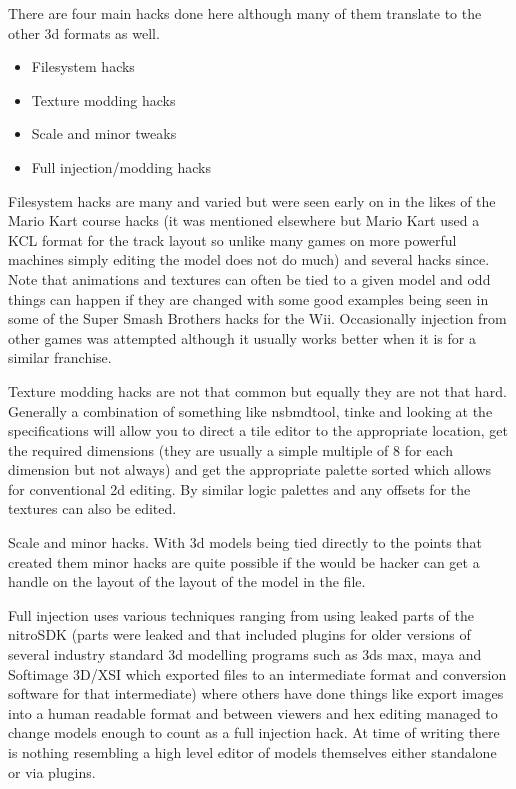 \documentclass[
]{book}
\providecommand{\tightlist}{%
  \setlength{\itemsep}{0pt}\setlength{\parskip}{0pt}}
\begin{document}
There are four main hacks done here although many of them translate to the other 3d formats as well.

\begin{itemize}
\tightlist
\item
  Filesystem hacks
\item
  Texture modding hacks
\item
  Scale and minor tweaks
\item
  Full injection/modding hacks
\end{itemize}

Filesystem hacks are many and varied but were seen early on in the likes of the Mario Kart course hacks (it was mentioned elsewhere but Mario Kart used a KCL format for the track layout so unlike many games on more powerful machines simply editing the model does not do much) and several hacks since. Note that animations and textures can often be tied to a given model and odd things can happen if they are changed with some good examples being seen in some of the Super Smash Brothers hacks for the Wii. Occasionally injection from other games was attempted although it usually works better when it is for a similar franchise.

Texture modding hacks are not that common but equally they are not that hard. Generally a combination of something like nsbmdtool, tinke and looking at the specifications will allow you to direct a tile editor to the appropriate location, get the required dimensions (they are usually a simple multiple of 8 for each dimension but not always) and get the appropriate palette sorted which allows for conventional 2d editing. By similar logic palettes and any offsets for the textures can also be edited.

Scale and minor hacks. With 3d models being tied directly to the points that created them minor hacks are quite possible if the would be hacker can get a handle on the layout of the layout of the model in the file.

Full injection uses various techniques ranging from using leaked parts of the nitroSDK (parts were leaked and that included plugins for older versions of several industry standard 3d modelling programs such as 3ds max, maya and Softimage 3D/XSI which exported files to an intermediate format and conversion software for that intermediate) where others have done things like export images into a human readable format and between viewers and hex editing managed to change models enough to count as a full injection hack. At time of writing there is nothing resembling a high level editor of models themselves either standalone or via plugins.
\end{document}
